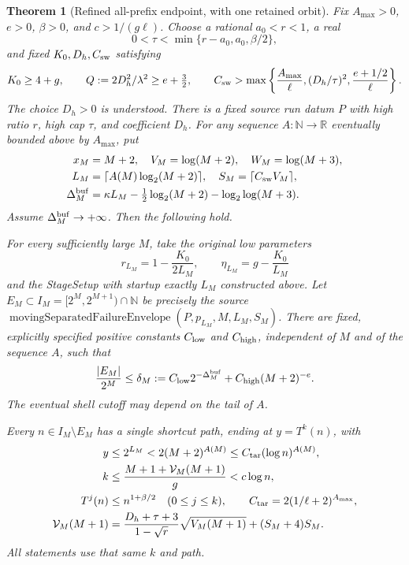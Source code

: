 \documentclass[11pt]{article}
\newtheorem{theorem}[proposition]{Theorem}
\theoremstyle{remark}\newtheorem{remark}[proposition]{Remark}
\newcommand{\NN}{\mathbb N}
\begin{document}
\begin{theorem}[Refined all-prefix endpoint, with one retained orbit]
\label{thm:shaik-refined-moving-endpoint}
Fix \(A_{\max}>0\), \(e>0\), \(\beta>0\), and
\(c>1/(g\ell)\). Choose a rational \(a_0<r<1\), a real
\[
 0<\tau<\min\{r-a_0,a_0,\beta/2\},
\]
and fixed \(K_0,D_h,C_{\rm sw}\) satisfying
\begin{equation}\label{eq:shaik-refined-moving-domain}
 K_0\ge4+g,\qquad
 Q:=2D_h^2/\lambda^2\ge e+\tfrac32,\qquad
 C_{\rm sw}>\max\left\{\frac{A_{\max}}{\ell},
                  (D_h/\tau)^2,\frac{e+1/2}{\ell}\right\}.
\end{equation}
The choice \(D_h>0\) is understood. There is a fixed source run datum
\(P\) with high ratio \(r\), high cap \(\tau\), and coefficient \(D_h\).
For any sequence \(A:\NN\to\mathbb R\) eventually bounded above by
\(A_{\max}\), put
\begin{equation}\label{eq:shaik-refined-moving-buffer}
 \begin{split}
 x_M&=M+2,\quad V_M=\log(M+2),\quad W_M=\log(M+3),\\
 L_M&=\lceil A(M)\log_2(M+2)\rceil,\quad
 S_M=\lceil C_{\rm sw}V_M\rceil,\\
 \Delta_M^{\rm buf}
   &=\kappa L_M-\tfrac12\log_2(M+2)-\log_2\log(M+3).
 \end{split}
\end{equation}
Assume \(\Delta_M^{\rm buf}\to+\infty\). Then the following hold.

For every sufficiently large \(M\), take the original low parameters
\[
 r_{L_M}=1-\frac{K_0}{2L_M},\qquad
 \eta_{L_M}=g-\frac{K_0}{L_M}
\]
and the StageSetup with startup exactly \(L_M\) constructed above.
Let \(E_M\subset I_M=[2^M,2^{M+1})\cap\NN\) be precisely the source
\(\operatorname{movingSeparatedFailureEnvelope}(P,p_{L_M},M,L_M,S_M)\).
There are fixed, explicitly specified positive constants \(C_{\rm low}\)
and \(C_{\rm high}\), independent of \(M\) and of the sequence \(A\), such that
\begin{equation}\label{eq:shaik-refined-moving-profile}
 \frac{|E_M|}{2^M}\le
 \delta_M:=C_{\rm low}2^{-\Delta_M^{\rm buf}}
                    +C_{\rm high}(M+2)^{-e}.
\end{equation}
The eventual shell cutoff may depend on the tail of \(A\).

Every \(n\in I_M\setminus E_M\) has a single shortcut path, ending at
\(y=T^k(n)\), with
\begin{equation}\label{eq:shaik-refined-moving-witness}
 \begin{split}
 y&\le2^{L_M}<2(M+2)^{A(M)}
       \le C_{\rm tar}(\log n)^{A(M)},\\
 k&\le \frac{M+1+\mathcal V_M(M+1)}g<c\log n,\\
 T^j(n)&\le n^{1+\beta/2}\quad(0\le j\le k),\qquad
 C_{\rm tar}=2(1/\ell+2)^{A_{\max}},\\
 \mathcal V_M(M+1)
   &=\frac{D_h+\tau+3}{1-\sqrt r}\sqrt{V_M(M+1)}
                         +(S_M+4)S_M .
 \end{split}
\end{equation}
All statements use that same \(k\) and path.


\end{theorem}
\end{document}
